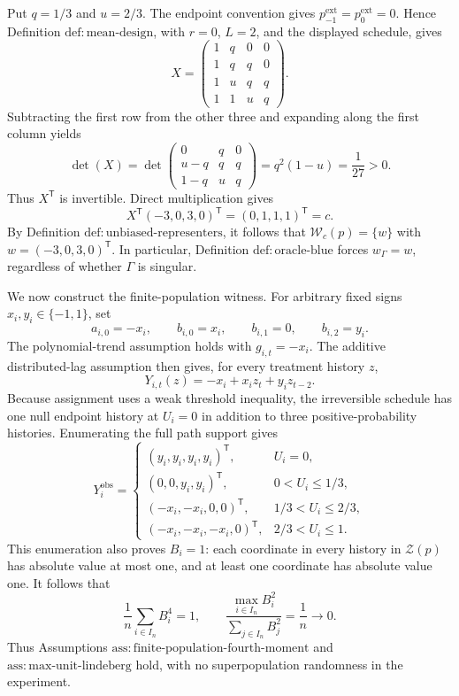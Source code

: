 Put \(q=1/3\) and \(u=2/3\).  The endpoint convention gives \(p^{\mathrm{ext}}_{-1}=p^{\mathrm{ext}}_0=0\).  Hence Definition \(\mathrm{def:mean\text{-}design}\), with \(r=0\), \(L=2\), and the displayed schedule, gives
\[
X=
\begin{pmatrix}
1&q&0&0\\
1&q&q&0\\
1&u&q&q\\
1&1&u&q
\end{pmatrix}.
\]
Subtracting the first row from the other three and expanding along the first column yields
\[
\det(X)=
\det\!\begin{pmatrix}
0&q&0\\
u-q&q&q\\
1-q&u&q
\end{pmatrix}
=q^2(1-u)=\frac1{27}>0.
\]
Thus \(X^{\mathsf T}\) is invertible.  Direct multiplication gives
\[
X^{\mathsf T}(-3,0,3,0)^{\mathsf T}
=(0,1,1,1)^{\mathsf T}=c.
\]
By Definition \(\mathrm{def:unbiased\text{-}representers}\), it follows that
\(\mathcal W_c(p)=\{w\}\) with \(w=(-3,0,3,0)^{\mathsf T}\).  In particular, Definition \(\mathrm{def:oracle\text{-}blue}\) forces \(w_\Gamma=w\), regardless of whether \(\Gamma\) is singular.

We now construct the finite-population witness.  For arbitrary fixed signs \(x_i,y_i\in\{-1,1\}\), set
\[
a_{i,0}=-x_i,\qquad b_{i,0}=x_i,\qquad b_{i,1}=0,
\qquad b_{i,2}=y_i.
\]
The polynomial-trend assumption holds with \(g_{i,t}=-x_i\).  The additive distributed-lag assumption then gives, for every treatment history \(z\),
\[
Y_{i,t}(z)=-x_i+x_i z_t+y_i z_{t-2}.
\]
Because assignment uses a weak threshold inequality, the irreversible schedule has one null endpoint history at \(U_i=0\) in addition to three positive-probability histories.  Enumerating the full path support gives
\[
Y_i^{\mathrm{obs}}=
\begin{cases}
(y_i,y_i,y_i,y_i)^{\mathsf T},&U_i=0,\\
(0,0,y_i,y_i)^{\mathsf T},&0<U_i\le1/3,\\
(-x_i,-x_i,0,0)^{\mathsf T},&1/3<U_i\le2/3,\\
(-x_i,-x_i,-x_i,0)^{\mathsf T},&2/3<U_i\le1.
\end{cases}
\tag{1}
\]
This enumeration also proves \(B_i=1\): each coordinate in every history in \(\mathcal Z(p)\) has absolute value at most one, and at least one coordinate has absolute value one.  It follows that
\[
\frac1n\sum_{i\in I_n}B_i^4=1,
\qquad
\frac{\max_{i\in I_n}B_i^2}{\sum_{j\in I_n}B_j^2}=\frac1n\longrightarrow0.
\]
Thus Assumptions \(\mathrm{ass:finite\text{-}population\text{-}fourth\text{-}moment}\) and \(\mathrm{ass:max\text{-}unit\text{-}lindeberg}\) hold, with no superpopulation randomness in the experiment.

